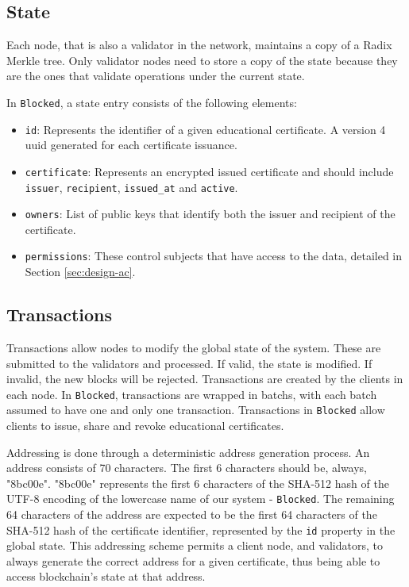 \subsection{State}
\label{sec:design-state}

Each node, that is also a validator in the network, maintains a copy of a Radix Merkle tree. Only validator nodes need to store a copy of the state because they are the ones that validate operations under the current state.

In \texttt{Blocked}, a state entry consists of the following elements:

\begin{itemize}
	\item \texttt{id}: Represents the identifier of a given educational certificate. A version 4 \gls{uuid} generated for each certificate issuance.
	\item \texttt{certificate}: Represents an encrypted issued certificate and should include \texttt{issuer}, \texttt{recipient}, \texttt{issued\_at} and \texttt{active}.
	\item \texttt{owners}: List of public keys that identify both the issuer and recipient of the certificate.
	\item \texttt{permissions}: These control subjects that have access to the data, detailed in Section \ref{sec:design-ac}.
\end{itemize}

\subsection{Transactions}
\label{sec:design-transactions}

Transactions allow nodes to modify the global state of the system. These are submitted to the validators and processed. If valid, the state is modified. If invalid, the new blocks will be rejected. Transactions are created by the clients in each node. In \texttt{Blocked}, transactions are wrapped in batchs, with each batch assumed to have one and only one transaction. Transactions in \texttt{Blocked} allow clients to issue, share and revoke educational certificates.

Addressing is done through a deterministic address generation process. An address consists of 70 characters. The first 6 characters should be, always, "8bc00e". "8bc00e" represents the first 6 characters of the SHA-512 hash of the UTF-8 encoding of the lowercase name of our system - \texttt{Blocked}. The remaining 64 characters of the address are expected to be the first 64 characters of the SHA-512 hash of the certificate identifier, represented by the \texttt{id} property in the global state. This addressing scheme permits a client node, and validators, to always generate the correct address for a given certificate, thus being able to access blockchain's state at that address.

